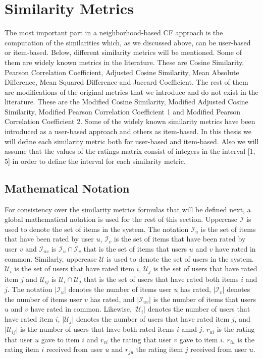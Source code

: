 \section{Similarity Metrics}\label{sec:2.2}
The most important part in a neighborhood-based CF approach is the computation of
the similarities which, as we discussed above, can be user-based or item-based.
Below, different similarity metrics will be mentioned. Some of them are widely known metrics
in the literature. These are Cosine Similarity, Pearson Correlation Coefficient,
Adjusted Cosine Similarity, Mean Absolute Difference, Mean Squared Difference and
Jaccard Coefficient. The rest of them are modifications
of the original metrics that we introduce and do not exist in the literature.
These are the Modified Cosine Similarity, Modified Adjusted Cosine Similarity,
Modified Pearson Correlation Coefficient 1 and Modified Pearson Correlation Coefficient 2.
Some of the widely known similarity metrics have been introduced as a user-based approach
and others as item-based. In this thesis we will define each similarity metric both for
user-based and item-based. Also we will assume that the values of the ratings matrix
consist of integers in the interval [1, 5] in order to define the interval for
each similarity metric.
\subsection{Mathematical Notation}
For consistency over the similarity metrics formulas that will be defined next,
a global mathematical notation is used for the rest of this section.
Uppercase $\mathcal{I}$ is used to denote the set of items in the system.
The notation $\mathcal{I}_u$ is the set of items that have been rated by
user $u$, $\mathcal{I}_v$ is the set of items that have been rated by
user $v$ and $\mathcal{I}_{uv}$ is $\mathcal{I}_u \cap \mathcal{I}_v$ that is the set of items that users $u$ and $v$ have
rated in common.
Similarly, uppercase $\mathcal{U}$ is used to denote the set of users in the system.
$\mathcal{U}_i$ is the set of users that have rated
item $i$, $\mathcal{U}_j$ is the set of users that have rated
item $j$ and $\mathcal{U}_{ij}$ is $\mathcal{U}_i \cap \mathcal{U}_j$ that is the set of users that have rated both
items $i$ and $j$. The notation $\mathopen|\mathcal{I}_{u}\mathclose|$ denotes
the number of items user $u$ has rated, $\mathopen|\mathcal{I}_{v}\mathclose|$
denotes the number of items user $v$ has rated, and $\mathopen|\mathcal{I}_{uv}\mathclose|$
is the number of items that users $u$ and $v$ have rated in common. Likewise,
$\mathopen|\mathcal{U}_{i}\mathclose|$ denotes the number of users that have
rated item $i$, $\mathopen|\mathcal{U}_{j}\mathclose|$ denotes the number of users that have rated
item $j$, and $\mathopen|\mathcal{U}_{ij}\mathclose|$ is the number of users that
have both rated items $i$ annd $j$.
$r_{ui}$ is the rating that user $u$ gave to item $i$ and
$r_{vi}$ the rating that user $v$ gave to item $i$.
$r_{iu}$ is the rating item $i$ received from user $u$ and
$r_{ju}$ the rating item $j$ received from user $u$.

